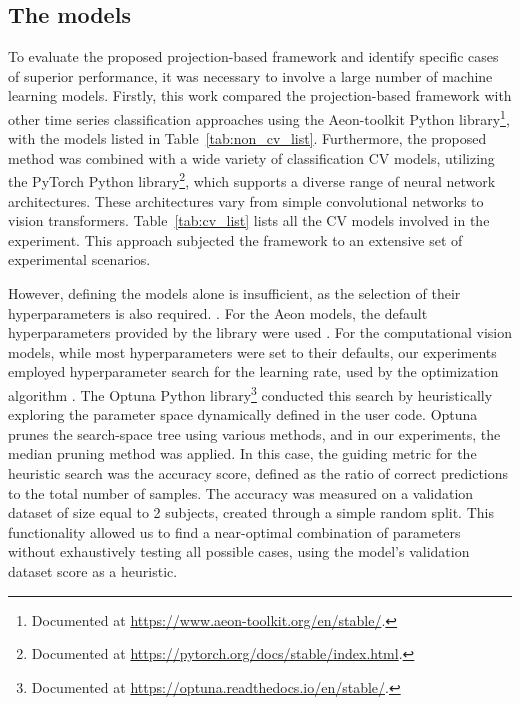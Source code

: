 \subsection{The models}

To evaluate the proposed projection-based framework and identify specific cases of superior performance, it was necessary to involve a large number of machine learning models. Firstly, this work compared the projection-based framework with other time series classification approaches using the Aeon-toolkit Python library\footnote{Documented at \url{https://www.aeon-toolkit.org/en/stable/}.}, with the models listed in Table~\ref{tab:non_cv_list}. Furthermore, the proposed method was combined with a wide variety of classification \gls{CV} models, utilizing the PyTorch Python library\footnote{Documented at \url{https://pytorch.org/docs/stable/index.html}.}, which supports a diverse range of neural network architectures. These architectures vary from simple convolutional networks to vision transformers. Table~\ref{tab:cv_list} lists all the \gls{CV} models involved in the experiment. This approach subjected the framework to an extensive set of experimental scenarios.

However, defining the models alone is insufficient, as the selection of their hyperparameters is also required. . For the Aeon models, the default hyperparameters provided by the library were used . For the computational vision models, while most hyperparameters were set to their defaults, our experiments employed hyperparameter search for the learning rate, used by the optimization algorithm . The Optuna Python library\footnote{Documented at \url{https://optuna.readthedocs.io/en/stable/}.} conducted this search by heuristically exploring the parameter space dynamically defined in the user code. Optuna prunes the search-space tree using various methods, and in our experiments, the median pruning method was applied. In this case, the guiding metric for the heuristic search was the accuracy score, defined as the ratio of correct predictions to the total number of samples.   The accuracy was measured on a validation dataset of size equal to 2 subjects, created through a simple random split. This functionality allowed us to find a near-optimal combination of parameters without exhaustively testing all possible cases, using the model's validation dataset score as a heuristic.


